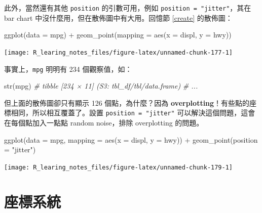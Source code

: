 \documentclass[
]{book}
\newenvironment{Shaded}{\begin{snugshade}}{\end{snugshade}}
\newcommand{\AttributeTok}[1]{\textcolor[rgb]{0.77,0.63,0.00}{#1}}
\newcommand{\CommentTok}[1]{\textcolor[rgb]{0.56,0.35,0.01}{\textit{#1}}}
\newcommand{\FunctionTok}[1]{\textcolor[rgb]{0.00,0.00,0.00}{#1}}
\newcommand{\NormalTok}[1]{#1}
\newcommand{\SpecialCharTok}[1]{\textcolor[rgb]{0.00,0.00,0.00}{#1}}
\newcommand{\StringTok}[1]{\textcolor[rgb]{0.31,0.60,0.02}{#1}}
\theoremstyle{definition}
\theoremstyle{remark}
\begin{document}
此外，當然還有其他 \texttt{position} 的引數可用，例如 \texttt{position\ =\ "jitter"}，其在 bar chart 中沒什麼用，但在散佈圖中有大用。回憶節 \ref{create} 的散佈圖：

\begin{Shaded}
\begin{Highlighting}[]
\FunctionTok{ggplot}\NormalTok{(}\AttributeTok{data =}\NormalTok{ mpg) }\SpecialCharTok{+} \FunctionTok{geom\_point}\NormalTok{(}\AttributeTok{mapping =} \FunctionTok{aes}\NormalTok{(}\AttributeTok{x =}\NormalTok{ displ, }\AttributeTok{y =}\NormalTok{ hwy))}
\end{Highlighting}
\end{Shaded}

\begin{center}\texttt{[image: R\_learing\_notes\_files/figure-latex/unnamed-chunk-177-1]} \end{center}

事實上，\texttt{mpg} 明明有 234 個觀察值，如：

\begin{Shaded}
\begin{Highlighting}[]
\FunctionTok{str}\NormalTok{(mpg)}
\CommentTok{\# tibble [234 × 11] (S3: tbl\_df/tbl/data.frame)}
\CommentTok{\# ...}
\end{Highlighting}
\end{Shaded}

但上面的散佈圖卻只有顯示 126 個點，為什麼？因為 \textbf{overplotting}！有些點的座標相同，所以相互覆蓋了。設置 \texttt{position\ =\ "jitter"} 可以解決這個問題，這會在每個點加入一點點 random noise，排除 overplotting 的問題。

\begin{Shaded}
\begin{Highlighting}[]
\FunctionTok{ggplot}\NormalTok{(}\AttributeTok{data =}\NormalTok{ mpg, }\AttributeTok{mapping =} \FunctionTok{aes}\NormalTok{(}\AttributeTok{x =}\NormalTok{ displ, }\AttributeTok{y =}\NormalTok{ hwy)) }\SpecialCharTok{+} 
  \FunctionTok{geom\_point}\NormalTok{(}\AttributeTok{position =} \StringTok{"jitter"}\NormalTok{)}
\end{Highlighting}
\end{Shaded}

\begin{center}\texttt{[image: R\_learing\_notes\_files/figure-latex/unnamed-chunk-179-1]} \end{center}

\hypertarget{ux5ea7ux6a19ux7cfbux7d71}{%
\section{座標系統}\label{ux5ea7ux6a19ux7cfbux7d71}}
\end{document}
